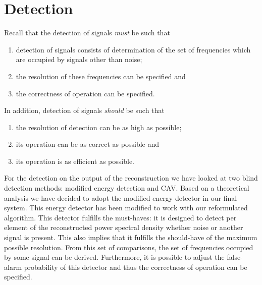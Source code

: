 \documentclass[a4paper, openany, oneside]{memoir}
\begin{document}
\section{Detection}
Recall that the detection of signals \emph{must} be such that
\begin{enumerate}
    \item detection of signals consists of determination of the set of frequencies which are occupied by signals other than noise;
    \item the resolution of these frequencies can be specified and
    \item the correctness of operation can be specified.
\end{enumerate}
In addition, detection of signals \emph{should} be such that
\begin{enumerate}
    \item the resolution of detection can be as high as possible;
    \item its operation can be as correct as possible and
    \item its operation is as efficient as possible.
\end{enumerate}

For the detection on the output of the reconstruction we have looked at two blind detection methods: modified energy detection and CAV. Based on  a theoretical analysis we have decided to adopt the modified energy detector in our final system. This energy detector has been modified to work with our reformulated algorithm. This detector fulfills the must-haves: it is designed to detect per element of the reconstructed power spectral
density whether noise or another signal is present. This also implies that it fulfills the should-have of the maximum possible resolution.  From this set of comparisons, the set of frequencies occupied by some signal can be derived. Furthermore, it is possible to adjust the false-alarm probability of this detector and thus the correctness of operation can be specified. 
\end{document}
